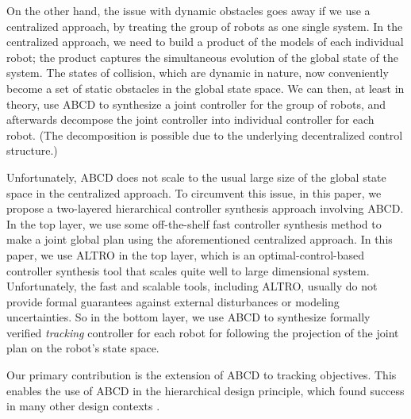 On the other hand, the issue with dynamic obstacles goes away if we use a centralized approach, by treating the group of robots as one single system.
In the centralized approach, we need to build a product of the models of each individual robot; the product captures the simultaneous evolution of the global state of the system.
The states of collision, which are dynamic in nature, now conveniently become a set of static obstacles in the global state space.
We can then, at least in theory, use ABCD to synthesize a joint controller for the group of robots, and afterwards decompose the joint controller into individual controller for each robot.
(The decomposition is possible due to the underlying decentralized control structure.)

Unfortunately, ABCD does not scale to the usual large size of the global state space in the centralized approach.
To circumvent this issue, in this paper, we propose a two-layered hierarchical controller synthesis approach involving ABCD.
In the top layer, we use some off-the-shelf fast controller synthesis method to make a joint global plan using the aforementioned centralized approach.
In this paper, we use ALTRO \cite{altro} in the top layer, which is an optimal-control-based controller synthesis tool that scales quite well to large dimensional system.
Unfortunately, the fast and scalable tools, including ALTRO, usually do not provide formal guarantees against external disturbances or modeling uncertainties.
So in the bottom layer, we use ABCD to synthesize formally verified \emph{tracking} controller for each robot for following the projection of the joint plan on the robot's state space.

Our primary contribution is the extension of ABCD to tracking objectives.
This enables the use of ABCD in the hierarchical design principle, which found success in many other design contexts \cite{murray,schmidt hierarchical DES, sayan mitra}.
